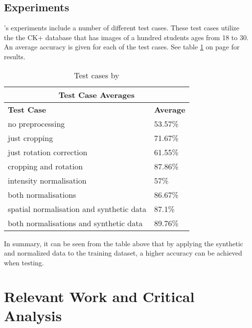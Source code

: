 \subsection{Experiments}
\citeauthor{LOPES}'s experiments include a number of different test cases. These test cases utilize the the CK+ database that has images of a hundred students ages from 18 to 30. An average accuracy is given for each of the test cases. See table \ref{table:testcases} on page \pageref{table:testcases} for results.

\begin{table}
\begin{tabular}{ |p{10cm}||p{3cm}|}
	\hline
	\multicolumn{2}{|c|}{Test Case Averages} \\
	\hline
 	\textbf{Test Case}& \textbf{Average}\\
	\hline
		no preprocessing  & 53.57\% \\
	\hline
		just cropping  & 71.67\%\\
	\hline
		just rotation correction  & 61.55\%\\
	\hline
		cropping and rotation  & 87.86\%\\
	\hline	
		intensity normalisation  & 57\%\\
	\hline
		both normalisations & 86.67\%\\
	\hline
		spatial normalisation and synthetic data & 87.1\%\\
	\hline
		both normalisations and synthetic data & 89.76\%\\
	\hline
\end{tabular}
\caption{Test cases by \citeauthor{LOPES}}
\label{table:testcases}
\end{table}


\newpage
In summary, it can be seen from the table above that by applying the synthetic and normalized data to the training dataset, a higher accuracy can be achieved when testing.

\section{Relevant Work and Critical Analysis}

